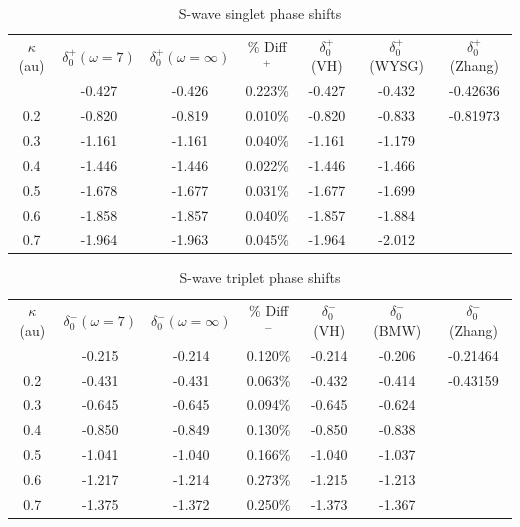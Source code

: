 \documentclass[preprint,showpacs,preprintnumbers,amsmath,amssymb]{revtex4}
\begin{document}
\begin{table}[H]
\centering
\begin{ruledtabular}
\begin{tabular}{c c c c c c c}
$\kappa$ (au) & $\delta_0^+ (\omega = 7)$ & $\delta_0^+ (\omega =\infty)$ & \% Diff$^+$ & $\delta_0^+$ (VH) & $\delta_0^+$ (WYSG) & $\delta_0^+$ (Zhang)\\
\colrule
0.1 & -0.427 & -0.426 & 0.223\% & -0.427 & -0.432 & -0.42636 \\
0.2 & -0.820 & -0.819 & 0.010\% & -0.820 & -0.833 & -0.81973 \\
0.3 & -1.161 & -1.161 & 0.040\% & -1.161 & -1.179 & \\
0.4 & -1.446 & -1.446 & 0.022\% & -1.446 & -1.466 & \\
0.5 & -1.678 & -1.677 & 0.031\% & -1.677 & -1.699 & \\
0.6 & -1.858 & -1.857 & 0.040\% & -1.857 & -1.884 & \\
0.7 & -1.964 & -1.963 & 0.045\% & -1.964 & -2.012 & \\
\end{tabular}
\end{ruledtabular}
\caption{S-wave singlet phase shifts}
\label{tab:SWaveSingletPhase}
\end{table}


\begin{table}[H]
\centering
\begin{ruledtabular}
\begin{tabular}{c c c c c c c}
$\kappa$ (au) & $\delta_0^- (\omega = 7)$ & $\delta_0^- (\omega = \infty)$ & \% Diff$^-$ & $\delta_0^-$ (VH) & $\delta_0^-$ (BMW) & $\delta_0^-$ (Zhang) \\
\colrule
0.1 & -0.215 & -0.214 & 0.120\% & -0.214 & -0.206 & -0.21464 \\
0.2 & -0.431 & -0.431 & 0.063\% & -0.432 & -0.414 & -0.43159 \\
0.3 & -0.645 & -0.645 & 0.094\% & -0.645 & -0.624 & \\
0.4 & -0.850 & -0.849 & 0.130\% & -0.850 & -0.838 & \\
0.5 & -1.041 & -1.040 & 0.166\% & -1.040 & -1.037 & \\
0.6 & -1.217 & -1.214 & 0.273\% & -1.215 & -1.213 & \\
0.7 & -1.375 & -1.372 & 0.250\% & -1.373 & -1.367 & \\
\end{tabular}
\end{ruledtabular}
\caption{S-wave triplet phase shifts}
\label{tab:SWaveTripletPhase}
\end{table}
\end{document}
